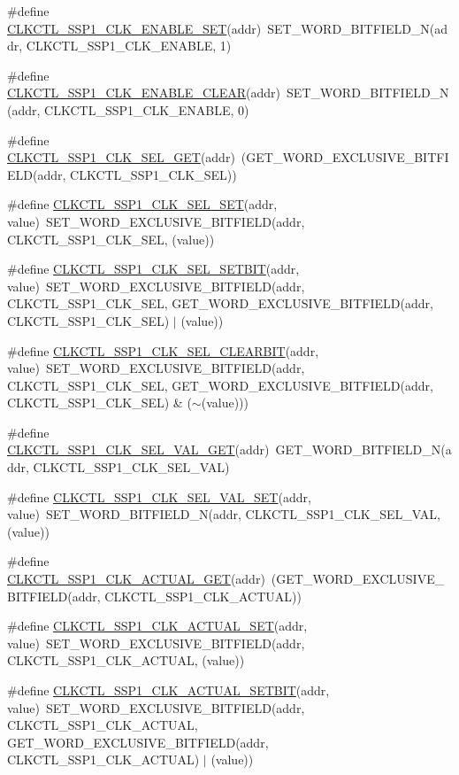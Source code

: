 \begin{DoxyCompactItemize}
\item 
\#define \hyperlink{a00544_adb4da137aecd637d92a9b8f79a76acff}{CLKCTL\_\-SSP1\_\-CLK\_\-ENABLE\_\-SET}(addr)~SET\_\-WORD\_\-BITFIELD\_\-N(addr, CLKCTL\_\-SSP1\_\-CLK\_\-ENABLE, 1)
\item 
\#define \hyperlink{a00544_ac0cf601d0538d03c18ffd423df715756}{CLKCTL\_\-SSP1\_\-CLK\_\-ENABLE\_\-CLEAR}(addr)~SET\_\-WORD\_\-BITFIELD\_\-N(addr, CLKCTL\_\-SSP1\_\-CLK\_\-ENABLE, 0)
\item 
\#define \hyperlink{a00544_aa9d7a0cbb324d94fdacb37f9e15cff9f}{CLKCTL\_\-SSP1\_\-CLK\_\-SEL\_\-GET}(addr)~(GET\_\-WORD\_\-EXCLUSIVE\_\-BITFIELD(addr, CLKCTL\_\-SSP1\_\-CLK\_\-SEL))
\item 
\#define \hyperlink{a00544_a0ed401aa502c0edca0fef77cd52e231d}{CLKCTL\_\-SSP1\_\-CLK\_\-SEL\_\-SET}(addr, value)~SET\_\-WORD\_\-EXCLUSIVE\_\-BITFIELD(addr, CLKCTL\_\-SSP1\_\-CLK\_\-SEL, (value))
\item 
\#define \hyperlink{a00544_a88b0f05abc665049ed6df9438e915a19}{CLKCTL\_\-SSP1\_\-CLK\_\-SEL\_\-SETBIT}(addr, value)~SET\_\-WORD\_\-EXCLUSIVE\_\-BITFIELD(addr, CLKCTL\_\-SSP1\_\-CLK\_\-SEL, GET\_\-WORD\_\-EXCLUSIVE\_\-BITFIELD(addr, CLKCTL\_\-SSP1\_\-CLK\_\-SEL) $|$ (value))
\item 
\#define \hyperlink{a00544_acccc9bf8ea757b07aabf4605e787850f}{CLKCTL\_\-SSP1\_\-CLK\_\-SEL\_\-CLEARBIT}(addr, value)~SET\_\-WORD\_\-EXCLUSIVE\_\-BITFIELD(addr, CLKCTL\_\-SSP1\_\-CLK\_\-SEL, GET\_\-WORD\_\-EXCLUSIVE\_\-BITFIELD(addr, CLKCTL\_\-SSP1\_\-CLK\_\-SEL) \& ($\sim$(value)))
\item 
\#define \hyperlink{a00544_a364614ae187f06c19c80d1e375c86814}{CLKCTL\_\-SSP1\_\-CLK\_\-SEL\_\-VAL\_\-GET}(addr)~GET\_\-WORD\_\-BITFIELD\_\-N(addr, CLKCTL\_\-SSP1\_\-CLK\_\-SEL\_\-VAL)
\item 
\#define \hyperlink{a00544_a20e44927c61a00f25ddcc5f4f502e322}{CLKCTL\_\-SSP1\_\-CLK\_\-SEL\_\-VAL\_\-SET}(addr, value)~SET\_\-WORD\_\-BITFIELD\_\-N(addr, CLKCTL\_\-SSP1\_\-CLK\_\-SEL\_\-VAL, (value))
\item 
\#define \hyperlink{a00544_af388527820bb9dfad261fa487fd597a4}{CLKCTL\_\-SSP1\_\-CLK\_\-ACTUAL\_\-GET}(addr)~(GET\_\-WORD\_\-EXCLUSIVE\_\-BITFIELD(addr, CLKCTL\_\-SSP1\_\-CLK\_\-ACTUAL))
\item 
\#define \hyperlink{a00544_a794203f41a2d4245e1133a4ff471982a}{CLKCTL\_\-SSP1\_\-CLK\_\-ACTUAL\_\-SET}(addr, value)~SET\_\-WORD\_\-EXCLUSIVE\_\-BITFIELD(addr, CLKCTL\_\-SSP1\_\-CLK\_\-ACTUAL, (value))
\item 
\#define \hyperlink{a00544_ad4d05ff8d47217ebc7008b0d44796295}{CLKCTL\_\-SSP1\_\-CLK\_\-ACTUAL\_\-SETBIT}(addr, value)~SET\_\-WORD\_\-EXCLUSIVE\_\-BITFIELD(addr, CLKCTL\_\-SSP1\_\-CLK\_\-ACTUAL, GET\_\-WORD\_\-EXCLUSIVE\_\-BITFIELD(addr, CLKCTL\_\-SSP1\_\-CLK\_\-ACTUAL) $|$ (value))

\end{DoxyCompactItemize}
